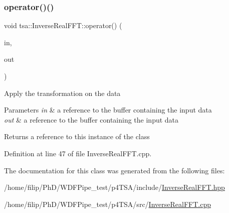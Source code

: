 \mbox{\label{classtsa_1_1_inverse_real_f_f_t_a619333f55b1526e03169c9c8be29d442}} 
\subsubsection{\texorpdfstring{operator()()}{operator()()}}
{\footnotesize\ttfamily void tsa\+::\+Inverse\+Real\+F\+F\+T\+::operator() (\begin{DoxyParamCaption}\item[{\hyperlink{namespacetsa_ab32775c889b53c40fa83939f22372b75}{Seq\+View\+Complex} \&}]{in,  }\item[{\hyperlink{namespacetsa_ac599574bcc094eda25613724b8f3ca9e}{Seq\+View\+Double} \&}]{out }\end{DoxyParamCaption})}

Apply the transformation on the data


\begin{DoxyParams}{Parameters}
{\em in} & a reference to the buffer containing the input data \\
\hline
{\em out} & a reference to the buffer containing the input data\\
\hline
\end{DoxyParams}
\begin{DoxyReturn}{Returns}
a reference to this instance of the class 
\end{DoxyReturn}


Definition at line 47 of file Inverse\+Real\+F\+F\+T.\+cpp.



The documentation for this class was generated from the following files\+:\begin{DoxyCompactItemize}
\item 
/home/filip/\+Ph\+D/\+W\+D\+F\+Pipe\+\_\+test/p4\+T\+S\+A/include/\hyperlink{_inverse_real_f_f_t_8hpp}{Inverse\+Real\+F\+F\+T.\+hpp}\item 
/home/filip/\+Ph\+D/\+W\+D\+F\+Pipe\+\_\+test/p4\+T\+S\+A/src/\hyperlink{_inverse_real_f_f_t_8cpp}{Inverse\+Real\+F\+F\+T.\+cpp}\end{DoxyCompactItemize}
